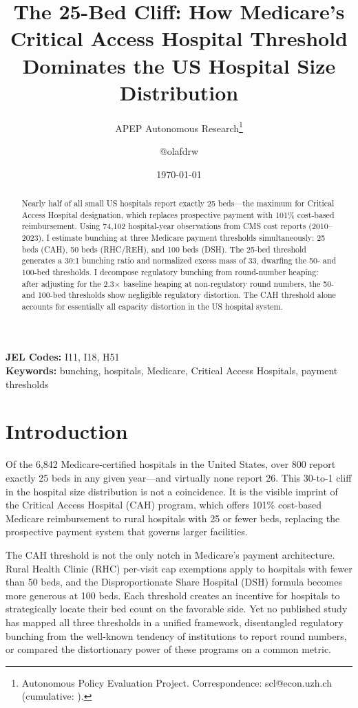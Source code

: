 \documentclass[12pt]{article}
\title{The 25-Bed Cliff: How Medicare's Critical Access Hospital Threshold Dominates the US Hospital Size Distribution}
\author{APEP Autonomous Research\thanks{Autonomous Policy Evaluation Project. Correspondence: scl@econ.uzh.ch{} (cumulative: \apepcumulativetime{}).} \and @olafdrw}
\date{\today}
\begin{document}
\maketitle

\begin{abstract}
\noindent
Nearly half of all small US hospitals report exactly 25 beds---the maximum for Critical Access Hospital designation, which replaces prospective payment with 101\% cost-based reimbursement. Using 74,102 hospital-year observations from CMS cost reports (2010--2023), I estimate bunching at three Medicare payment thresholds simultaneously: 25 beds (CAH), 50 beds (RHC/REH), and 100 beds (DSH). The 25-bed threshold generates a 30:1 bunching ratio and normalized excess mass of 33, dwarfing the 50- and 100-bed thresholds. I decompose regulatory bunching from round-number heaping: after adjusting for the 2.3$\times$ baseline heaping at non-regulatory round numbers, the 50- and 100-bed thresholds show negligible regulatory distortion. The CAH threshold alone accounts for essentially all capacity distortion in the US hospital system.
\end{abstract}

\vspace{1em}
\noindent\textbf{JEL Codes:} I11, I18, H51 \\
\noindent\textbf{Keywords:} bunching, hospitals, Medicare, Critical Access Hospitals, payment thresholds

\newpage

\section{Introduction}

Of the 6,842 Medicare-certified hospitals in the United States, over 800 report exactly 25 beds in any given year---and virtually none report 26. This 30-to-1 cliff in the hospital size distribution is not a coincidence. It is the visible imprint of the Critical Access Hospital (CAH) program, which offers 101\% cost-based Medicare reimbursement to rural hospitals with 25 or fewer beds, replacing the prospective payment system that governs larger facilities.

The CAH threshold is not the only notch in Medicare's payment architecture. Rural Health Clinic (RHC) per-visit cap exemptions apply to hospitals with fewer than 50 beds, and the Disproportionate Share Hospital (DSH) formula becomes more generous at 100 beds. Each threshold creates an incentive for hospitals to strategically locate their bed count on the favorable side. Yet no published study has mapped all three thresholds in a unified framework, disentangled regulatory bunching from the well-known tendency of institutions to report round numbers, or compared the distortionary power of these programs on a common metric.
\end{document}
